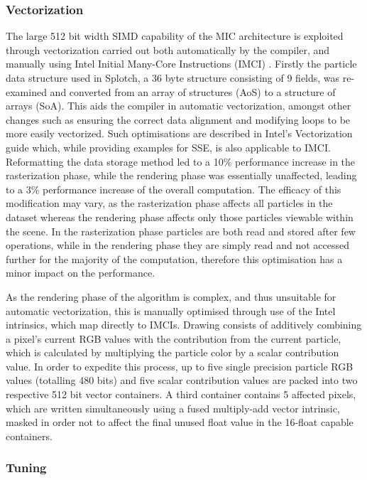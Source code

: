 \documentclass[runningheads,a4paper]{llncs}
\begin{document}
\subsubsection{Vectorization}
\label{sect:vectorization}

The large 512 bit width SIMD capability of the MIC architecture is exploited through vectorization carried out both 
automatically by the compiler, and manually using Intel Initial Many-Core Instructions (IMCI) \cite{imci}. Firstly the 
particle data structure used in Splotch, a 36 byte structure consisting of 9 fields, was re-examined and converted from an 
array of structures (AoS) to a structure of arrays (SoA). This aids the compiler in automatic vectorization, 
amongst other changes such as ensuring the correct data alignment and modifying loops to be more easily vectorized. 
Such optimisations are described in Intel's Vectorization guide \cite{vectorguide} which, while providing examples for SSE, is also 
applicable to IMCI. Reformatting the data storage method led to a 10\% performance increase in the rasterization phase, 
while the rendering phase was essentially unaffected, leading to a 3\% performance increase of the overall computation. 
The efficacy of this modification may vary, as the rasterization phase affects all particles in the dataset whereas the rendering phase 
affects only those particles viewable within the scene. In the rasterization phase particles are both read and stored after few 
operations, while in the rendering phase they are simply read and not accessed further for the majority of the computation, therefore 
this optimisation has a minor impact on the performance.

As the rendering phase of the algorithm is complex, and thus unsuitable for automatic vectorization, this is manually 
optimised through use of the Intel intrinsics, which map directly to IMCIs. Drawing consists of additively 
combining a pixel's current RGB values with the contribution from the current particle, which is calculated by 
multiplying the particle color by a scalar contribution value. In order to expedite this process, up to five single 
precision particle RGB values (totalling 480 bits) and five scalar contribution values are packed into two respective 
512 bit vector containers. A third container contains 5 affected pixels, which are written simultaneously using a 
fused multiply-add vector intrinsic, masked in order not to affect the final unused float value in the 16-float 
capable containers.

\subsubsection{Tuning}
\label{sect:tuning}
\end{document}

